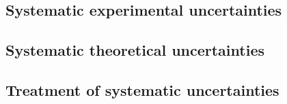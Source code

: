 \subsection{Systematic experimental uncertainties}
\subsection{Systematic theoretical uncertainties}
\subsection{Treatment of systematic uncertainties}
